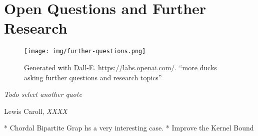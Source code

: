 \chapter{Open Questions and Further Research}\label{ch:closing}

\vspace*{-50pt}

\begin{figure}[ht]
        \texttt{[image: img/further-questions.png]}
        \captionsetup{textformat=empty,labelformat=blank}
        \caption{Generated with Dall-E. \url{https://labs.openai.com/}. ``more ducks asking further questions and research topics''}
\end{figure}

\epigraph{\itshape Todo select another quote}{Lewis Caroll, \textit{XXXX}}

* Chordal Bipartite Grap hs a very interesting case.
* Improve the Kernel Bound
